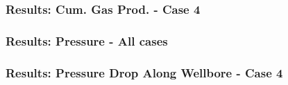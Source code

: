 \begin{frame}
    \frametitle{Results: Cum. Gas Prod. - Case 4}
    \centerline{}
\end{frame}


\begin{frame}
    \frametitle{Results: Pressure - All cases}
    \centerline{}
\end{frame}


\begin{frame}
    \frametitle{Results: Pressure Drop Along Wellbore - Case 4}
    \centerline{}
\end{frame}
